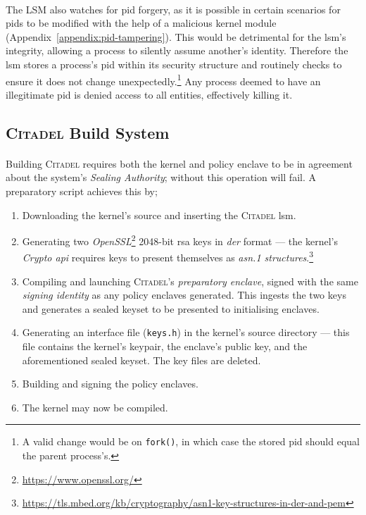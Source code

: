 \paragraph{} The LSM also watches for \acrshort{pid} forgery, as it is possible in certain scenarios for \acrshort{pid}s to be modified with the help of a malicious kernel module (Appendix~\ref{appendix:pid-tampering}). This would be detrimental for the \acrshort{lsm}'s integrity, allowing a process to silently assume another's identity. Therefore the \acrshort{lsm} stores a process's \acrshort{pid} within its security structure and routinely checks to ensure it does not change unexpectedly.\footnote{A valid change would be on \texttt{fork()}, in which case the stored \acrshort{pid} should equal the parent process's.} Any process deemed to have an illegitimate \acrshort{pid} is denied access to all entities, effectively killing it.

\subsection{\textsc{Citadel} Build System}
\label{sec:build-system}
\paragraph{} Building \textsc{Citadel} requires both the kernel and policy enclave to be in agreement about the system's \textit{Sealing Authority}; without this operation will fail. A preparatory script achieves this by;

\begin{enumerate}
    \item Downloading the kernel's source and inserting the \textsc{Citadel} \acrshort{lsm}.
    \item Generating two \textit{OpenSSL}\footnote{\url{https://www.openssl.org/}} 2048-bit \acrshort{rsa} keys in \textit{\acrshort{der}} format --- the kernel's \textit{Crypto \acrshort{api}} requires keys to present themselves as \textit{\acrshort{asn}.1 structures}.\footnote{\url{https://tls.mbed.org/kb/cryptography/asn1-key-structures-in-der-and-pem}}
    \item Compiling and launching \textsc{Citadel}'s \textit{preparatory enclave}, signed with the same \textit{signing identity} as any policy enclaves generated. This ingests the two keys and generates a sealed keyset to be presented to initialising enclaves.
    \item Generating an interface file (\texttt{keys.h}) in the kernel's source directory --- this file contains the kernel's keypair, the enclave's public key, and the aforementioned sealed keyset. The key files are deleted.
    \item Building and signing the policy enclaves.
    \item The kernel may now be compiled.
\end{enumerate}
